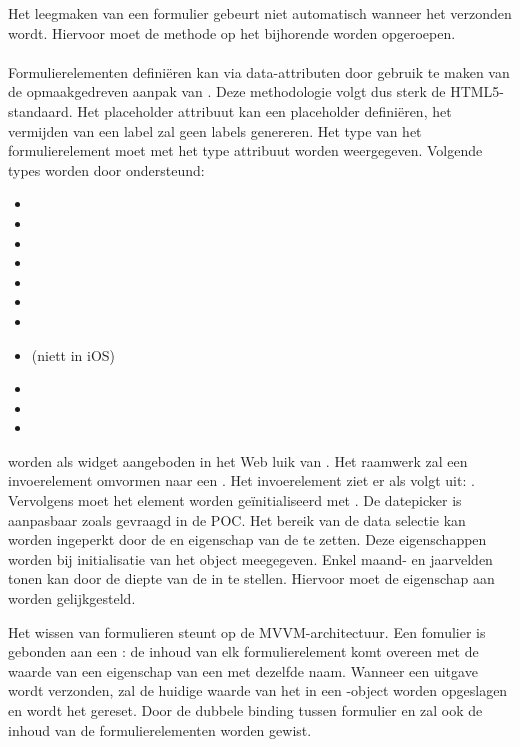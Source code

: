 Het leegmaken van een formulier gebeurt niet automatisch wanneer het verzonden wordt.
Hiervoor moet de  methode op het bijhorende  worden opgeroepen.

\paragraph{\kendo}
 Formulierelementen definiëren kan via data-attributen door gebruik te maken van de opmaakgedreven aanpak van \kendo.
 Deze methodologie volgt dus sterk de HTML5-standaard.
 Het placeholder attribuut kan een placeholder definiëren,  het vermijden van een label zal geen labels genereren.
 Het type van het formulierelement moet met het type attribuut worden weergegeven.
 Volgende types worden door \kendo{} ondersteund:
 \begin{itemize}
  \item {}
  \item {}
  \item {}
  \item {}
  \item {}
  \item {}
  \item {}
  \item {} (niett in iOS)
  \item {}
  \item {} 
  \item {}
 \end{itemize}

  worden als widget aangeboden in het Web luik van \kendo{}.
 Het raamwerk zal een invoerelement omvormen naar een .
 Het invoerelement ziet er als volgt uit: .  
 Vervolgens moet het element worden geïnitialiseerd met .
 De datepicker is aanpasbaar zoals gevraagd in de POC.
 Het bereik van de data selectie kan worden ingeperkt door de  en  eigenschap van de  te zetten.
 Deze eigenschappen worden bij initialisatie van het object meegegeven.
 Enkel maand- en jaarvelden tonen kan door de diepte van de  in te stellen.
 Hiervoor moet de eigenschap  aan  worden gelijkgesteld.
 
 Het wissen van formulieren steunt op de MVVM-architectuur.
 Een fomulier is gebonden aan een :  de inhoud van elk formulierelement komt overeen met de waarde van een eigenschap van een  met dezelfde naam.
 Wanneer een uitgave wordt verzonden, zal de huidige waarde van het  in een \js-object worden opgeslagen en wordt het  gereset.
 Door de dubbele binding tussen formulier en  zal ook de inhoud van de formulierelementen worden gewist.
 
